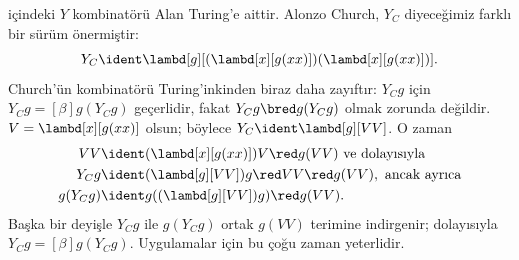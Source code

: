 \documentclass[../../../include/open-logic-section]{subfiles}
\begin{document}
 içindeki $Y$ kombinatörü Alan Turing'e aittir. Alonzo
Church, $Y_C$ diyeceğimiz farklı bir sürüm önermiştir:
\[
Y_C \ident \lambd[g][(\lambd[x][g(xx)])(\lambd[x][g(xx)])].
\]
Church'ün kombinatörü Turing'inkinden biraz daha zayıftır: $Y_Cg$ için
$Y_Cg\equal[\beta]g(Y_Cg)$ geçerlidir, fakat $Y_Cg\bred g(Y_Cg)$ olmak
zorunda değildir. $V=\lambd[x][g(xx)]$ olsun; böylece
$Y_C\ident\lambd[g][VV]$. O zaman
\begin{align*}
  VV & \ident (\lambd[x][g(xx)])V \red g(VV)
  \text{ ve dolayısıyla}\\
  Y_C g & \ident (\lambd[g][VV])g \red VV \red g(VV), \text{ ancak ayrıca}\\
  g(Y_C g) & \ident g((\lambd[g][VV])g) \red g(VV).
\end{align*}
Başka bir deyişle $Y_Cg$ ile $g(Y_Cg)$ ortak $g(VV)$ terimine indirgenir;
dolayısıyla $Y_Cg\equal[\beta]g(Y_Cg)$. Uygulamalar için bu çoğu zaman
yeterlidir.
\end{document}
